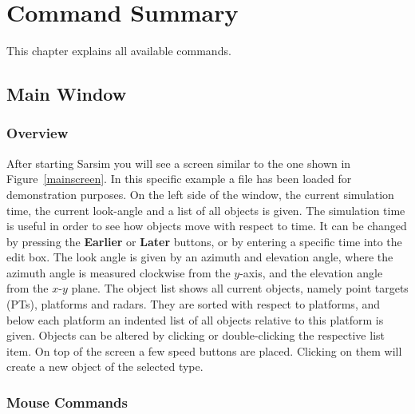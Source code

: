                       

\chapter{Command Summary\label{chapter:commands}}

This chapter explains all available commands.

\section{Main Window}

\subsection{Overview}

After starting Sarsim you will see a screen similar to the one shown in
Figure~\ref{mainscreen}. In this specific example a file has been loaded for
demonstration purposes. On the left side of the window, the current
simulation time, the current look-angle and a list of all objects is given.
The simulation time is useful in order to see how objects move with respect
to time. It can be changed by pressing the \textbf{Earlier} or \textbf{Later}
buttons, or by entering a specific time into the edit box. The look angle is
given by an azimuth and elevation angle, where the azimuth angle is measured
clockwise from the $y$-axis, and the elevation angle from the $x$-$y$ plane.
The object list shows all current objects, namely point targets (PTs),
platforms and radars. They are sorted with respect to platforms, and below
each platform an indented list of all objects relative to this platform is
given. Objects can be altered by clicking or double-clicking the respective
list item. On top of the screen a few speed buttons are placed. Clicking on
them will create a new object of the selected type.


\subsection{Mouse Commands}

